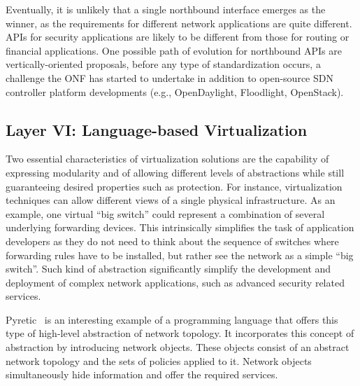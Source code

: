 Eventually, it is unlikely that a single northbound interface emerges as the winner, as the requirements for 
different network applications are quite different. APIs for security applications are likely to be different 
from those for routing or financial applications. One possible path of evolution for northbound APIs are 
vertically-oriented proposals, before any type of standardization occurs, a challenge the ONF has started 
to undertake in addition to open-source SDN controller platform developments (e.g., OpenDaylight, Floodlight,
OpenStack). 

\subsection{Layer VI: Language-based Virtualization}
\label{sec:virtualizationslicing}

Two essential characteristics of virtualization solutions are the capability of expressing modularity 
and of allowing different levels of abstractions while still guaranteeing desired properties such as protection.
For instance, virtualization techniques can allow different views of a single physical infrastructure.
As an example, one virtual ``big switch'' could represent a combination of several underlying forwarding devices.
This intrinsically simplifies the task of application developers as they do not need to think about the sequence of switches where forwarding rules have to be installed, but rather see the network as a 
simple ``big switch''.
Such kind of abstraction significantly simplify the development 
and deployment of complex network applications, such as advanced security related services.

Pyretic~\cite{reich2013} is an interesting example of a programming language that offers this type of high-level abstraction of network topology.
It incorporates this concept of abstraction by introducing network objects.
These objects consist of an abstract network topology and the sets of policies applied to it.
Network objects simultaneously hide information and offer the required services.


